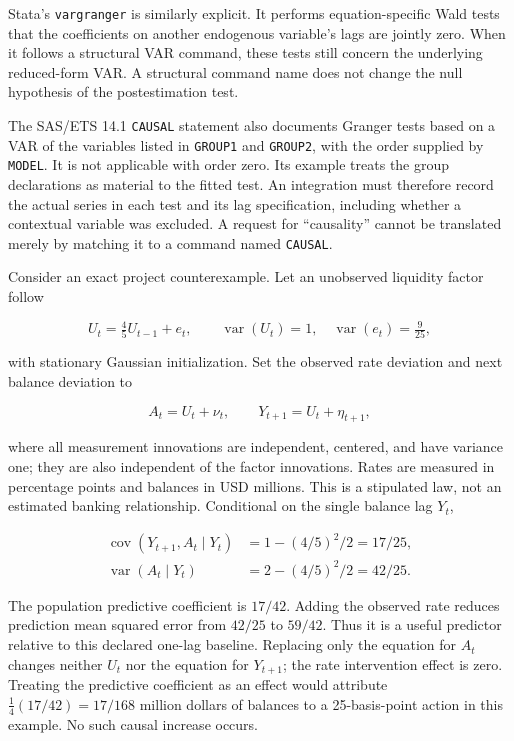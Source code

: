 Stata's \texttt{vargranger} is similarly explicit. It performs
equation-specific Wald tests that the coefficients on another endogenous
variable's lags are jointly zero. When it follows a structural VAR
command, these tests still concern the underlying reduced-form VAR. A
structural command name does not change the null hypothesis of the
postestimation test. \citep{exec13_ct_stata_granger}

The SAS/ETS 14.1 \texttt{CAUSAL} statement also documents Granger tests
based on a VAR of the variables listed in \texttt{GROUP1} and
\texttt{GROUP2}, with the order supplied by \texttt{MODEL}. It is not
applicable with order zero. Its example treats the group declarations as
material to the fitted test. An integration must therefore record the
actual series in each test and its lag specification, including whether
a contextual variable was excluded. A request for ``causality'' cannot
be translated merely by matching it to a command named
\texttt{CAUSAL}.\citep{exec13_ct_sas_causal}

Consider an exact project counterexample. Let an unobserved liquidity
factor follow

\[
 U_t=\tfrac45U_{t-1}+e_t,\qquad
 \operatorname{var}(U_t)=1,\quad \operatorname{var}(e_t)=\tfrac9{25},
\]

with stationary Gaussian initialization. Set the observed rate deviation
and next balance deviation to

\[
 A_t=U_t+\nu_t,\qquad Y_{t+1}=U_t+\eta_{t+1},
\]

where all measurement innovations are independent, centered, and have
variance one; they are also independent of the factor innovations. Rates
are measured in percentage points and balances in USD millions. This is
a stipulated law, not an estimated banking relationship. Conditional on
the single balance lag \(Y_t\),

\[
 \begin{aligned}
 \operatorname{cov}(Y_{t+1},A_t\mid Y_t)&=1-(4/5)^2/2=17/25,\\
 \operatorname{var}(A_t\mid Y_t)&=2-(4/5)^2/2=42/25.
 \end{aligned}
\]

The population predictive coefficient is \(17/42\). Adding the observed
rate reduces prediction mean squared error from \(42/25\) to \(59/42\).
Thus it is a useful predictor relative to this declared one-lag
baseline. Replacing only the equation for \(A_t\) changes neither
\(U_t\) nor the equation for \(Y_{t+1}\); the rate intervention effect
is zero. Treating the predictive coefficient as an effect would
attribute \(\tfrac14(17/42)=17/168\) million dollars of balances to a
25-basis-point action in this example. No such causal increase occurs.
\citep{exec13_ct_examples}

